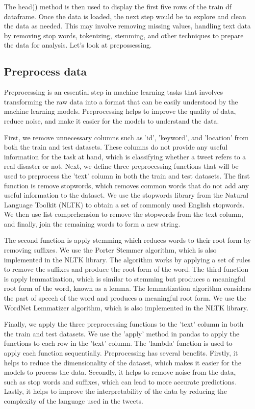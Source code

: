 \documentclass[11pt]{diazessay} %
\begin{document}
The head() method is then used to display the first five rows of the train \textunderscore df dataframe. Once the data is loaded, the next step would be to explore and clean the data as needed. This may involve removing missing values, handling text data by removing stop words, tokenizing, stemming, and other techniques to prepare the data for analysis. Let's look at prepossessing.

\subsection{Preprocess data}

Preprocessing is an essential step in machine learning tasks that involves transforming the raw data into a format that can be easily understood by the machine learning models. Preprocessing helps to improve the quality of data, reduce noise, and make it easier for the models to understand the data.

First, we remove unnecessary columns such as 'id', 'keyword', and 'location' from both the train and test datasets. These columns do not provide any useful information for the task at hand, which is classifying whether a tweet refers to a real disaster or not. Next, we define three preprocessing functions that will be used to preprocess the 'text' column in both the train and test datasets. The first function is remove \textunderscore stopwords, which removes common words that do not add any useful information to the dataset. We use the stopwords library from the Natural Language Toolkit (NLTK) to obtain a set of commonly used English stopwords. We then use list comprehension to remove the stopwords from the text column, and finally, join the remaining words to form a new string.

The second function is apply \textunderscore stemming which reduces words to their root form by removing suffixes. We use the Porter Stemmer algorithm, which is also implemented in the NLTK library. The algorithm works by applying a set of rules to remove the suffixes and produce the root form of the word. The third function is apply \textunderscore lemmatization, which is similar to stemming but produces a meaningful root form of the word, known as a lemma. The lemmatization algorithm considers the part of speech of the word and produces a meaningful root form. We use the WordNet Lemmatizer algorithm, which is also implemented in the NLTK library.

Finally, we apply the three preprocessing functions to the 'text' column in both the train and test datasets. We use the 'apply' method in pandas to apply the functions to each row in the 'text' column. The 'lambda' function is used to apply each function sequentially. Preprocessing has several benefits. Firstly, it helps to reduce the dimensionality of the dataset, which makes it easier for the models to process the data. Secondly, it helps to remove noise from the data, such as stop words and suffixes, which can lead to more accurate predictions. Lastly, it helps to improve the interpretability of the data by reducing the complexity of the language used in the tweets.
\end{document}
